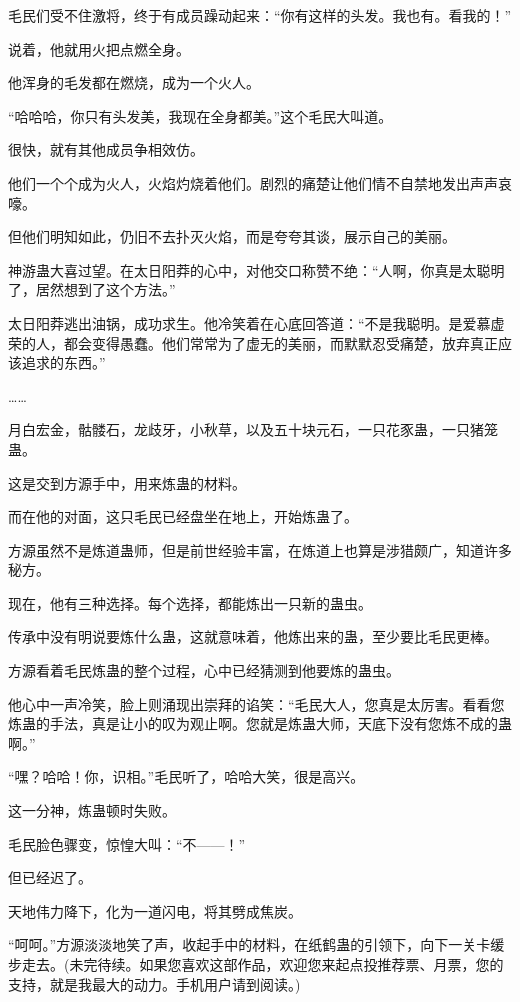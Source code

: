 \begin{this_body}
毛民们受不住激将，终于有成员躁动起来：“你有这样的头发。我也有。看我的！”

说着，他就用火把点燃全身。

他浑身的毛发都在燃烧，成为一个火人。

“哈哈哈，你只有头发美，我现在全身都美。”这个毛民大叫道。

很快，就有其他成员争相效仿。

他们一个个成为火人，火焰灼烧着他们。剧烈的痛楚让他们情不自禁地发出声声哀嚎。

但他们明知如此，仍旧不去扑灭火焰，而是夸夸其谈，展示自己的美丽。

神游蛊大喜过望。在太日阳莽的心中，对他交口称赞不绝：“人啊，你真是太聪明了，居然想到了这个方法。”

太日阳莽逃出油锅，成功求生。他冷笑着在心底回答道：“不是我聪明。是爱慕虚荣的人，都会变得愚蠢。他们常常为了虚无的美丽，而默默忍受痛楚，放弃真正应该追求的东西。”

……

月白宏金，骷髅石，龙歧牙，小秋草，以及五十块元石，一只花豕蛊，一只猪笼蛊。

这是交到方源手中，用来炼蛊的材料。

而在他的对面，这只毛民已经盘坐在地上，开始炼蛊了。

方源虽然不是炼道蛊师，但是前世经验丰富，在炼道上也算是涉猎颇广，知道许多秘方。

现在，他有三种选择。每个选择，都能炼出一只新的蛊虫。

传承中没有明说要炼什么蛊，这就意味着，他炼出来的蛊，至少要比毛民更棒。

方源看着毛民炼蛊的整个过程，心中已经猜测到他要炼的蛊虫。

他心中一声冷笑，脸上则涌现出崇拜的谄笑：“毛民大人，您真是太厉害。看看您炼蛊的手法，真是让小的叹为观止啊。您就是炼蛊大师，天底下没有您炼不成的蛊啊。”

“嘿？哈哈！你，识相。”毛民听了，哈哈大笑，很是高兴。

这一分神，炼蛊顿时失败。

毛民脸色骤变，惊惶大叫：“不——！”

但已经迟了。

天地伟力降下，化为一道闪电，将其劈成焦炭。

“呵呵。”方源淡淡地笑了声，收起手中的材料，在纸鹤蛊的引领下，向下一关卡缓步走去。(未完待续。如果您喜欢这部作品，欢迎您来起点投推荐票、月票，您的支持，就是我最大的动力。手机用户请到阅读。)

\end{this_body}


